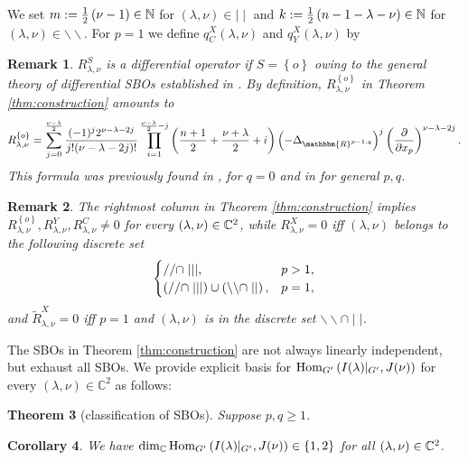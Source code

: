 \documentclass[12pt]{article} %
\newtheorem{theorem}{Theorem}
\newcommand{\Hom}{\mbox{\normalfont Hom}}
\newtheorem{remark}[theorem]{Remark}
\newtheorem{corollary}[theorem]{Corollary}
\theoremstyle{definition}
\theoremstyle{exampstyle} \newtheorem{examp}[theorem]{Theorem}
\newcommand{\IlambdaGprime}{I(\lambda)\kern-0.3em\mid_{G'}}
\newcommand{\SBO}{\Hom_{G'}\left(\IlambdaGprime,J(\nu) \right)}
\newcommand{\mm}{\mid\mid}
\newcommand{\bb}{\backslash\backslash}
\begin{document}
We set $m:=\frac{1}{2}\left( \nu-1 \right)\in\mathbb{N}$ for $(\lambda,\nu)\in\mm$ and $k:=\frac{1}{2}\left( n-1-\lambda-\nu \right)\in\mathbb{N}$ for $(\lambda,\nu)\in\bb$.
For $p=1$ we define $q_C^X(\lambda,\nu)$ and $q_Y^X(\lambda,\nu)$ by
\begin{remark}
	$R_{\lambda,\nu}^S$ is a differential operator if $S=\left\{ o \right\}$ owing to the general theory of differential SBOs established in \cite[Chap.\ 2]{kobayashi2016differential1}.
	By definition, $R_{\lambda,\nu}^{ \left\{ o \right\}}$ in Theorem \ref{thm:construction} amounts to
	\begin{equation*}
		R_{\lambda,\nu}^{ \left\{ o \right\}}=
		\sum_{j=0}^{\frac{\nu-\lambda}{2}}\frac{(-1)^j2^{\nu-\lambda-2j}}{j!(\nu-\lambda-2j)!}\prod_{i=1}^{\frac{\nu-\lambda}{2}-j}\left( \frac{n
		+1}{2}+\frac{\nu+\lambda}{2}
		+i \right)\left(- \Delta_{\mathbbm{R}^{p-1,q}} \right)^j\left( \frac{\partial}{\partial x_p} \right)^{\nu-\lambda-2j}.
	\end{equation*}
	This formula was previously found in \cite[Thms. 5.1.1 and 5.2.1]{juhl2009families}, \cite[(10.1)]{kobayashi2015symmetry} for $q=0$ and in \cite[Thm.\ 4.3]{kobayashi2015branching}
	for general $p,q$.
\end{remark}
\begin{remark}\label{rmk:thm:construction}
	The rightmost column in Theorem \ref{thm:construction} implies $R_{\lambda,\nu}^{ \left\{ o \right\}},R_{\lambda,\nu}^Y,R_{\lambda,\nu}^C\neq0$
	for every $(\lambda,\nu)\in\mathbb{C}^2$, while
	$R^X_{\lambda,\nu}=0$ iff $(\lambda,\nu)$ belongs to the following discrete set
	\[\begin{cases}
			//\cap\mid\mid\mid,&p>1,\\
			\left(//\cap\mid\mid\mid\right) \cup \left(\backslash\backslash\cap\mid\mid\right),&p=1,
		\end{cases}
	\]
	and $\tilde{R}_{\lambda,\nu}^X=0$ iff $p=1$ and $(\lambda,\nu)$ is in the discrete set $\backslash\backslash\cap \mid\mid$.
\end{remark}
The SBOs in Theorem \ref{thm:construction} are not always linearly independent, but exhaust all SBOs. We provide explicit
basis for $\SBO$ for every $(\lambda,\nu)\in \mathbb{C}^2$ as follows:
\begin{theorem}[classification of SBOs]\label{thm:classif}
	Suppose $p,q\ge1$.
\end{theorem}
\begin{corollary}\label{cor:classif}
	We have $\dim_{\C}\SBO\in\left\{ 1,2 \right\}$ for all $(\lambda,\nu)\in\mathbb{C}^2$.
\end{corollary}
\end{document}

